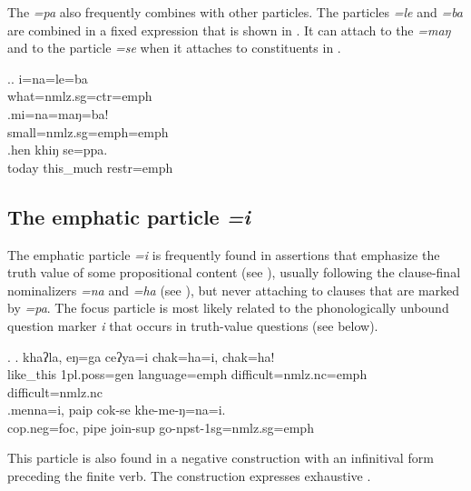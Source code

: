  The   \emph{=pa} also frequently combines with other particles. The particles \emph{=le} and \emph{=ba} are combined in a fixed expression that is shown in \Next[a]. It can attach to the  \emph{=maŋ} and to the  particle \emph{=se} when it attaches to constituents in .
 
 \ex.\ag. i=na=le=ba\\
 	what{\sc =nmlz.sg=ctr=emph}\\ 
 \bg.mi=na=maŋ=ba!\\
small{\sc =nmlz.sg=emph=emph}\\
  
 \bg.hen khiŋ se=ppa.\\
 today this\_much {\sc restr=emph}\\
 
\subsection{The emphatic particle \emph{=i}} 
 The emphatic  particle \emph{=i} is frequently found  in assertions that emphasize the truth value of some propositional content (see \Next ), usually following the clause-final nominalizers \emph{=na} and \emph{=ha} (see ), but never attaching to clauses that are marked by \emph{=pa}. The focus particle is most likely related to the phonologically unbound question marker \emph{i} that occurs in truth-value questions (see below).

 
 \ex. \ag. khaʔla,  eŋ=ga              ceʔya=i   chak=ha=i, chak=ha!\\
	 like\_this {\sc 1pl.poss=gen} language{\sc =emph} difficult{\sc =nmlz.nc=emph} difficult{\sc =nmlz.nc}  \\
	  
\newpage
	 	 \bg.menna=i, paip cok-se khe-me-ŋ=na=i.\\
	 {\sc cop.neg=foc}, pipe join{\sc -sup} go{\sc -npst-1sg=nmlz.sg=emph}\\
	
	
This  particle is also found in a negative construction with an infinitival form preceding the finite verb. The construction expresses exhaustive  .
	
